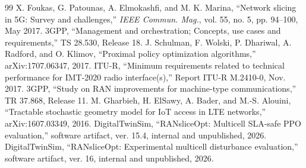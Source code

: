 \documentclass[conference]{IEEEtran}
\begin{document}
\begin{thebibliography}{99}
 X. Foukas, G. Patounas, A. Elmokashfi, and M. K. Marina, ``Network slicing in 5G: Survey and challenges,'' \emph{IEEE Commun. Mag.}, vol. 55, no. 5, pp. 94--100, May 2017.
 3GPP, ``Management and orchestration; Concepts, use cases and requirements,'' TS 28.530, Release 18.
 J. Schulman, F. Wolski, P. Dhariwal, A. Radford, and O. Klimov, ``Proximal policy optimization algorithms,'' arXiv:1707.06347, 2017.
 ITU-R, ``Minimum requirements related to technical performance for IMT-2020 radio interface(s),'' Report ITU-R M.2410-0, Nov. 2017.
 3GPP, ``Study on RAN improvements for machine-type communications,'' TR 37.868, Release 11.
 M. Gharbieh, H. ElSawy, A. Bader, and M.-S. Alouini, ``Tractable stochastic geometry model for IoT access in LTE networks,'' arXiv:1607.03349, 2016.
 DigitalTwinSim, ``RANsliceOpt: Multicell SLA-safe PPO evaluation,'' software artifact, ver. 15.4, internal and unpublished, 2026.
 DigitalTwinSim, ``RANsliceOpt: Experimental multicell disturbance evaluation,'' software artifact, ver. 16, internal and unpublished, 2026.
\end{thebibliography}
\end{document}
